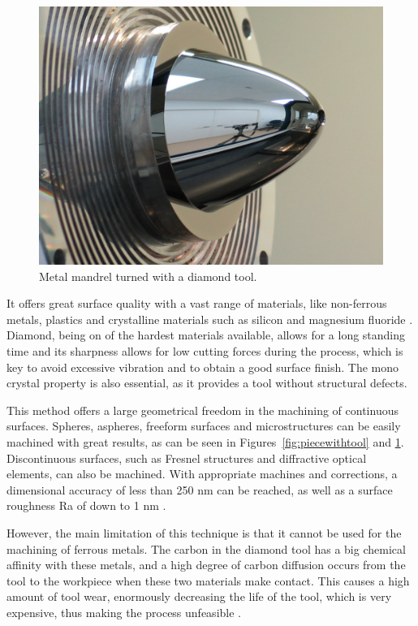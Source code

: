 	\begin{figure}[H]
		\centering
		\captionsetup{justification=centering}
		\includegraphics[width=0.8\linewidth]{Cap2/Diamondturning/mandrel.jpg}
		\caption{Metal mandrel turned with a diamond tool.}
		\label{fig:mandrel}
	\end{figure}
	
	It offers great surface quality with a vast range of materials, like non-ferrous metals, plastics and crystalline materials such as silicon and magnesium fluoride \cite{gerchman1986}. Diamond, being on of the hardest materials available, allows for a long standing time and its sharpness allows for low cutting forces during the process, which is key to avoid excessive vibration and to obtain a good surface finish. The mono crystal property is also essential, as it provides a tool without structural defects.
	
	This method offers a large geometrical freedom in the machining of continuous surfaces. Spheres, aspheres, freeform surfaces and microstructures can be easily machined with great results, as can be seen in Figures~\ref{fig:piecewithtool} and \ref{fig:mandrel}. Discontinuous surfaces, such as Fresnel structures and diffractive optical elements, can also be machined. With appropriate machines and corrections, a dimensional accuracy of less than 250 nm can be reached, as well as a surface roughness Ra of down to 1 nm \cite{cheung2001}.
	
	However, the main limitation of this technique is that it cannot be used for the machining of ferrous metals. The carbon in the diamond tool has a big chemical affinity with these metals, and a high degree of carbon diffusion occurs from the tool to the workpiece when these two materials make contact. This causes a high amount of tool wear, enormously decreasing the life of the tool, which is very expensive, thus making the process unfeasible \cite{paul1996,thornton1978}.
	
